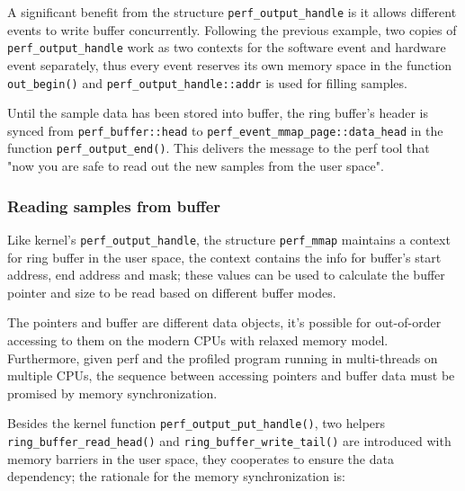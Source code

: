 \documentclass[11pt]{diazessay} %
\def\code#1{\texttt{#1}}
\begin{document}
A significant benefit from the structure \code{perf\_output\_handle} is it allows different events to write buffer concurrently.  Following the previous example, two copies of \code{perf\_output\_handle} work as two contexts for the software event and hardware event separately, thus every event reserves its own memory space in the function \code{out\_begin()} and \code{perf\_output\_handle::addr} is used for filling samples.

Until the sample data has been stored into buffer, the ring buffer's header is synced from \code{perf\_buffer::head} to \code{perf\_event\_mmap\_page::data\_head} in the function \code{perf\_output\_end()}.  This delivers the message to the perf tool that "now you are safe to read out the new samples from the user space".

\subsubsection*{Reading samples from buffer}

Like kernel's \code{perf\_output\_handle}, the structure \code{perf\_mmap} maintains a context for ring buffer in the user space, the context contains the info for buffer's start address, end address and mask; these values can be used to calculate the buffer pointer and size to be read based on different buffer modes.

The pointers and buffer are different data objects, it's possible for out-of-order accessing to them on the modern CPUs with relaxed memory model.  Furthermore, given perf and the profiled program running in multi-threads on multiple CPUs, the sequence between accessing pointers and buffer data must be promised by memory synchronization.

Besides the kernel function \code{perf\_output\_put\_handle()}, two helpers\\\code{ring\_buffer\_read\_head()} and \code{ring\_buffer\_write\_tail()} are introduced with memory barriers in the user space, they cooperates to ensure the data dependency; the rationale for the memory synchronization is:
\end{document}
